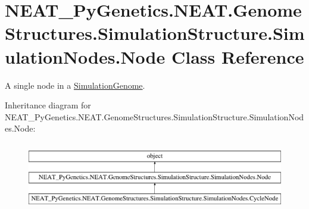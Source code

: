 \hypertarget{classNEAT__PyGenetics_1_1NEAT_1_1GenomeStructures_1_1SimulationStructure_1_1SimulationNodes_1_1Node}{}\section{N\+E\+A\+T\+\_\+\+Py\+Genetics.\+N\+E\+A\+T.\+Genome\+Structures.\+Simulation\+Structure.\+Simulation\+Nodes.\+Node Class Reference}
\label{classNEAT__PyGenetics_1_1NEAT_1_1GenomeStructures_1_1SimulationStructure_1_1SimulationNodes_1_1Node}


A single node in a \hyperlink{namespaceNEAT__PyGenetics_1_1NEAT_1_1GenomeStructures_1_1SimulationStructure_1_1SimulationGenome}{Simulation\+Genome}.  


Inheritance diagram for N\+E\+A\+T\+\_\+\+Py\+Genetics.\+N\+E\+A\+T.\+Genome\+Structures.\+Simulation\+Structure.\+Simulation\+Nodes.\+Node\+:\begin{figure}[H]
\begin{center}
\leavevmode
\includegraphics[height=3.000000cm]{classNEAT__PyGenetics_1_1NEAT_1_1GenomeStructures_1_1SimulationStructure_1_1SimulationNodes_1_1Node}
\end{center}
\end{figure}
